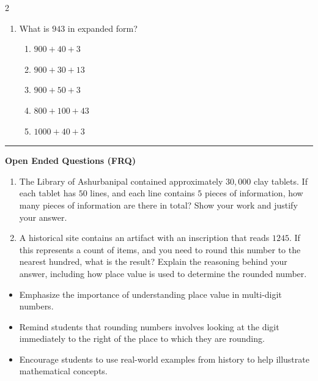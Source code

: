 \documentclass[10pt]{article}
\begin{document}
\begin{multicols}{2}
\begin{enumerate}[label=\textbf{Q\arabic*.}, leftmargin=*, itemsep=6pt, parsep=0pt]
  \item \small What is $943$ in expanded form?
  \begin{enumerate}[label=(\Alph*), leftmargin=0.6cm, nosep, itemsep=2pt]
    \item $900 + 40 + 3$
    \item $900 + 30 + 13$
    \item $900 + 50 + 3$
    \item $800 + 100 + 43$
    \item $1000 + 40 + 3$
  \end{enumerate}

\end{enumerate}
\end{multicols}

\vspace{-0.2cm}
\hrule
\vspace{0.2cm}
\textbf{\small Open Ended Questions (FRQ)}
\begin{enumerate}[label=\textbf{Q\arabic*.}, start=9, itemsep=5pt, topsep=0pt]

  \item \small The Library of Ashurbanipal contained approximately $30,000$ clay tablets. If each tablet has $50$ lines, and each line contains $5$ pieces of information, how many pieces of information are there in total? Show your work and justify your answer. \vspace{2cm}

  \item \small A historical site contains an artifact with an inscription that reads $1245$. If this represents a count of items, and you need to round this number to the nearest hundred, what is the result? Explain the reasoning behind your answer, including how place value is used to determine the rounded number. \vspace{2cm}

\end{enumerate}

\vfill

\begin{tcolorbox}[colback=blue!5, colframe=mainblue!50, title=\small \textbf{Chef's Tips}, fonttitle=\bfseries, bottom=1mm]
\begin{itemize}[noitemsep, topsep=2pt, leftmargin=0.5cm]
  \item \scriptsize Emphasize the importance of understanding place value in multi-digit numbers.\item \scriptsize Remind students that rounding numbers involves looking at the digit immediately to the right of the place to which they are rounding.\item \scriptsize Encourage students to use real-world examples from history to help illustrate mathematical concepts.
\end{itemize}
\end{tcolorbox}
\end{document}
